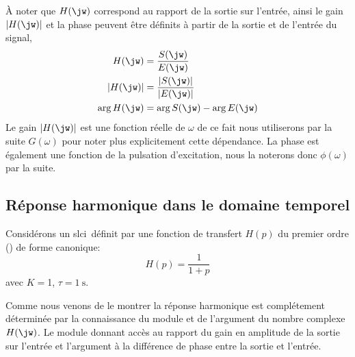 \`A noter que $H(\jw)$ correspond au rapport de la sortie sur l'entrée,
ainsi le gain $|H(\jw)|$ et la phase peuvent être définits à partir de la 
sortie et de l'entrée du signal,
\begin{align*}
    H(\jw) &= \dfrac{S(\jw)}{E(\jw)} \\
    |H(\jw)|&= \dfrac{|S(\jw)|}{|E(\jw)|} \\
    \arg{H(\jw)}&=\arg{S(\jw)}-\arg{E(\jw)}
\end{align*}
Le gain $|H(\jw)|$ est une fonction réelle de $\omega$ de ce fait nous 
utiliserons par la suite $G(\omega)$ pour noter plus explicitement cette 
dépendance. La phase est également une fonction de la pulsation d'excitation, 
nous la noterons donc $\phi(\omega)$ par la suite.
\newpage
{}
\captionsetup{width=0.9\linewidth}
\subsection{Réponse harmonique dans le domaine temporel}
Considérons un \gls{slci}~définit par une fonction de transfert $H(p)$ du 
premier ordre () de forme canonique:
\[
H(p)=\dfrac{1}{1+p}
\]
avec $K=$1, $\tau=\SI{1}{\second}$.

Comme nous venons de le montrer la réponse harmonique est complétement 
déterminée par la connaissance du module et de l'argument du nombre complexe
$H(\jw)$. Le module donnant accès au rapport du gain en amplitude de la sortie 
sur l'entrée et l'argument à la différence de phase entre la sortie et l'entrée.

